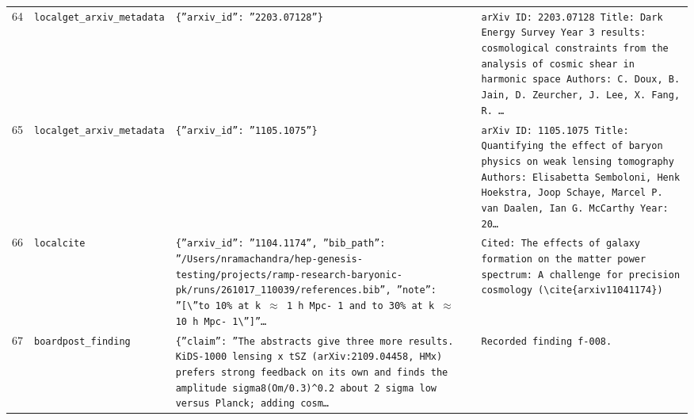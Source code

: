 \documentclass[11pt,a4paper]{article}
\begin{document}
\begin{longtable}{@{}p{}p{}p{}p{}@{}}
64 & \texttt{local}\newline\texttt{get\_\allowbreak{}arxiv\_\allowbreak{}metadata} & \texttt{\{''arxiv\_\allowbreak{}id'':\allowbreak{} ''2203.07128''\}\allowbreak{}} & \texttt{arXiv ID:\allowbreak{} 2203.07128 Title:\allowbreak{} Dark Energy Survey Year 3 results:\allowbreak{} cosmological constraints from the analysis of cosmic shear in harmonic space Authors:\allowbreak{} C. Doux,\allowbreak{} B. Jain,\allowbreak{} D. Zeurcher,\allowbreak{} J. Lee,\allowbreak{} X. Fang,\allowbreak{} R. \ldots{}\allowbreak{}} \\
65 & \texttt{local}\newline\texttt{get\_\allowbreak{}arxiv\_\allowbreak{}metadata} & \texttt{\{''arxiv\_\allowbreak{}id'':\allowbreak{} ''1105.1075''\}\allowbreak{}} & \texttt{arXiv ID:\allowbreak{} 1105.1075 Title:\allowbreak{} Quantifying the effect of baryon physics on weak lensing tomography Authors:\allowbreak{} Elisabetta Semboloni,\allowbreak{} Henk Hoekstra,\allowbreak{} Joop Schaye,\allowbreak{} Marcel P. van Daalen,\allowbreak{} Ian G. McCarthy Year:\allowbreak{} 20\ldots{}\allowbreak{}} \\
66 & \texttt{local}\newline\texttt{cite} & \texttt{\{''arxiv\_\allowbreak{}id'':\allowbreak{} ''1104.1174'',\allowbreak{} ''bib\_\allowbreak{}path'':\allowbreak{} ''/\allowbreak{}Users/\allowbreak{}nramachandra/\allowbreak{}hep-genesis-testing/\allowbreak{}projects/\allowbreak{}ramp-research-baryonic-pk/\allowbreak{}runs/\allowbreak{}261017\_\allowbreak{}110039/\allowbreak{}references.bib'',\allowbreak{} ''note'':\allowbreak{} ''[\textbackslash{}\allowbreak{}''to 10\% at k $\approx$ 1 h Mpc- 1 and to 30\% at k $\approx$ 10 h Mpc- 1\textbackslash{}\allowbreak{}'']\allowbreak{}''\ldots{}\allowbreak{}} & \texttt{Cited:\allowbreak{} The effects of galaxy formation on the matter power spectrum:\allowbreak{} A challenge for precision cosmology (\textbackslash{}\allowbreak{}cite\{arxiv11041174\}\allowbreak{})\allowbreak{}} \\
67 & \texttt{board}\newline\texttt{post\_\allowbreak{}finding} & \texttt{\{''claim'':\allowbreak{} ''The abstracts give three more results. KiDS-1000 lensing x tSZ (arXiv:\allowbreak{}2109.04458,\allowbreak{} HMx)\allowbreak{} prefers strong feedback on its own and finds the amplitude sigma8(Om/\allowbreak{}0.3)\allowbreak{}\textasciicircum{}\allowbreak{}0.2 about 2 sigma low versus Planck;\allowbreak{} adding cosm\ldots{}\allowbreak{}} & \texttt{Recorded finding f-008.} \\

\end{longtable}
\end{document}
